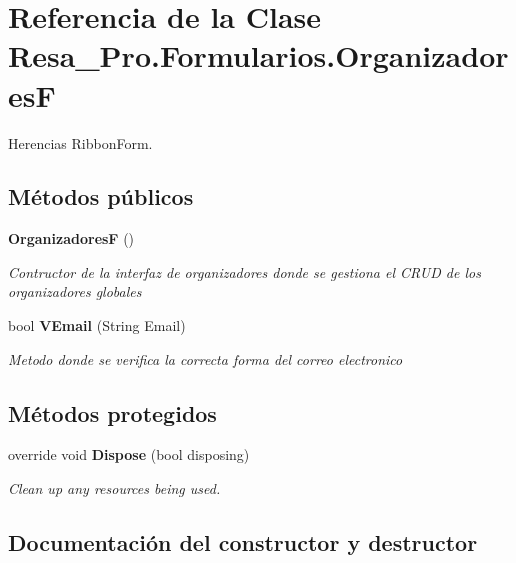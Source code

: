 \section{Referencia de la Clase Resa\+\_\+\+Pro.\+Formularios.\+OrganizadoresF}
\label{class_resa___pro_1_1_formularios_1_1_organizadores_f}


Herencias Ribbon\+Form.

\subsection*{Métodos públicos}
\begin{DoxyCompactItemize}
\item 
{\bf OrganizadoresF} ()
\begin{DoxyCompactList}\small\item\em Contructor de la interfaz de organizadores donde se gestiona el C\+R\+UD de los organizadores globales \end{DoxyCompactList}\item 
bool {\bf V\+Email} (String Email)
\begin{DoxyCompactList}\small\item\em Metodo donde se verifica la correcta forma del correo electronico \end{DoxyCompactList}\end{DoxyCompactItemize}
\subsection*{Métodos protegidos}
\begin{DoxyCompactItemize}
\item 
override void {\bf Dispose} (bool disposing)
\begin{DoxyCompactList}\small\item\em Clean up any resources being used. \end{DoxyCompactList}\end{DoxyCompactItemize}


\subsection{Documentación del constructor y destructor}
